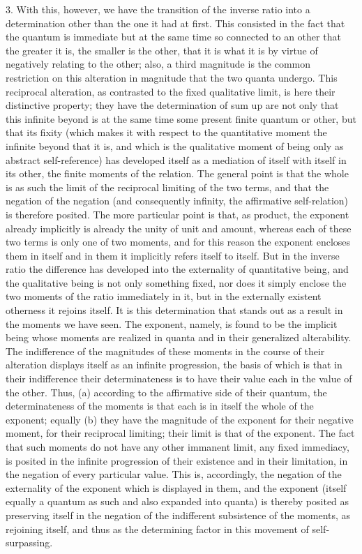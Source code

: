 3. With this, however, we have the transition of
the inverse ratio into a determination
other than the one it had at first.
This consisted in the fact that
the quantum is immediate
but at the same time so connected to
an other that the greater it is,
the smaller is the other,
that it is what it is by virtue of
negatively relating to the other;
also, a third magnitude is the
common restriction on this alteration
in magnitude that the two quanta undergo.
This reciprocal alteration,
as contrasted to the fixed qualitative limit,
is here their distinctive property;
they have the determination of
sum up are not only that this infinite beyond is
at the same time some present finite quantum or other,
but that its fixity
(which makes it with respect to the quantitative moment
the infinite beyond that it is,
and which is the qualitative moment of
being only as abstract self-reference)
has developed itself as a mediation
of itself with itself in its other,
the finite moments of the relation.
The general point is that the whole is as
such the limit of the reciprocal limiting of the two terms,
and that the negation of the negation
(and consequently infinity, the affirmative self-relation)
is therefore posited.
The more particular point is that, as product,
the exponent already implicitly is already
the unity of unit and amount,
whereas each of these two terms is
only one of two moments,
and for this reason the exponent encloses them in itself
and in them it implicitly refers itself to itself.
But in the inverse ratio the difference has developed
into the externality of quantitative being,
and the qualitative being is not only something fixed,
nor does it simply enclose the two moments
of the ratio immediately in it,
but in the externally existent otherness it rejoins itself.
It is this determination that stands out as a result
in the moments we have seen.
The exponent, namely, is found to be
the implicit being whose moments are realized in quanta
and in their generalized alterability.
The indifference of the magnitudes of these moments in the course of their
alteration displays itself as an infinite progression,
the basis of which is that in their indifference
their determinateness is to have their value
each in the value of the other.
Thus, (a) according to the affirmative side of their quantum,
the determinateness of the moments is that each is in itself
the whole of the exponent;
equally (b) they have the magnitude of the
exponent for their negative moment, for their reciprocal limiting;
their limit is that of the exponent.
The fact that such moments do not have any other immanent limit,
any fixed immediacy, is posited in the infinite progression
of their existence and in their limitation,
in the negation of every particular value.
This is, accordingly, the negation of the externality
of the exponent which is displayed in them, and the exponent
(itself equally a quantum as such and also expanded into quanta)
is thereby posited as preserving itself
in the negation of the indifferent subsistence of the moments,
as rejoining itself, and thus as the determining factor
in this movement of self-surpassing.

